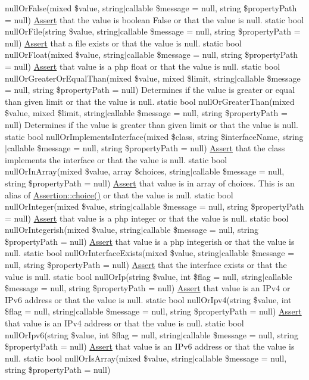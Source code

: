 null\+Or\+False(mixed \$value, string$\vert$callable \$message = null, string \$property\+Path = null) \mbox{\hyperlink{class_assert_1_1_assert}{Assert}} that the value is boolean False or that the value is null.  static bool null\+Or\+File(string \$value, string$\vert$callable \$message = null, string \$property\+Path = null) \mbox{\hyperlink{class_assert_1_1_assert}{Assert}} that a file exists or that the value is null.  static bool null\+Or\+Float(mixed \$value, string$\vert$callable \$message = null, string \$property\+Path = null) \mbox{\hyperlink{class_assert_1_1_assert}{Assert}} that value is a php float or that the value is null.  static bool null\+Or\+Greater\+Or\+Equal\+Than(mixed \$value, mixed \$limit, string$\vert$callable \$message = null, string \$property\+Path = null) Determines if the value is greater or equal than given limit or that the value is null.  static bool null\+Or\+Greater\+Than(mixed \$value, mixed \$limit, string$\vert$callable \$message = null, string \$property\+Path = null) Determines if the value is greater than given limit or that the value is null.  static bool null\+Or\+Implements\+Interface(mixed \$class, string \$interface\+Name, string$\vert$callable \$message = null, string \$property\+Path = null) \mbox{\hyperlink{class_assert_1_1_assert}{Assert}} that the class implements the interface or that the value is null.  static bool null\+Or\+In\+Array(mixed \$value, array \$choices, string$\vert$callable \$message = null, string \$property\+Path = null) \mbox{\hyperlink{class_assert_1_1_assert}{Assert}} that value is in array of choices. This is an alias of \mbox{\hyperlink{class_assert_1_1_assertion_a3775923caa193a78aa0bb48a66ee61d0}{Assertion\+::choice()}} or that the value is null.  static bool null\+Or\+Integer(mixed \$value, string$\vert$callable \$message = null, string \$property\+Path = null) \mbox{\hyperlink{class_assert_1_1_assert}{Assert}} that value is a php integer or that the value is null.  static bool null\+Or\+Integerish(mixed \$value, string$\vert$callable \$message = null, string \$property\+Path = null) \mbox{\hyperlink{class_assert_1_1_assert}{Assert}} that value is a php integer\textquotesingle{}ish or that the value is null.  static bool null\+Or\+Interface\+Exists(mixed \$value, string$\vert$callable \$message = null, string \$property\+Path = null) \mbox{\hyperlink{class_assert_1_1_assert}{Assert}} that the interface exists or that the value is null.  static bool null\+Or\+Ip(string \$value, int \$flag = null, string$\vert$callable \$message = null, string \$property\+Path = null) \mbox{\hyperlink{class_assert_1_1_assert}{Assert}} that value is an I\+Pv4 or I\+Pv6 address or that the value is null.  static bool null\+Or\+Ipv4(string \$value, int \$flag = null, string$\vert$callable \$message = null, string \$property\+Path = null) \mbox{\hyperlink{class_assert_1_1_assert}{Assert}} that value is an I\+Pv4 address or that the value is null.  static bool null\+Or\+Ipv6(string \$value, int \$flag = null, string$\vert$callable \$message = null, string \$property\+Path = null) \mbox{\hyperlink{class_assert_1_1_assert}{Assert}} that value is an I\+Pv6 address or that the value is null.  static bool null\+Or\+Is\+Array(mixed \$value, string$\vert$callable \$message = null, string \$property\+Path = null) 